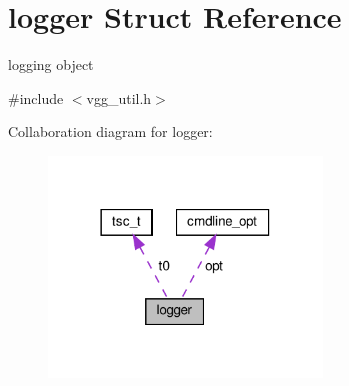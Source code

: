 \hypertarget{structlogger}{}\section{logger Struct Reference}
\label{structlogger}


logging object  




{\ttfamily \#include $<$vgg\+\_\+util.\+h$>$}



Collaboration diagram for logger\+:\nopagebreak
\begin{figure}[H]
\begin{center}
\leavevmode
\includegraphics[width=206pt]{structlogger__coll__graph}
\end{center}
\end{figure}
